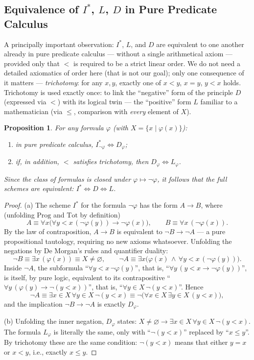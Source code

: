 \documentclass[12pt,a4paper]{article}
\theoremstyle{plain}
\newtheorem{proposition}[theorem]{Proposition}
\theoremstyle{definition}
\newcommand{\ph}{\varphi}
\newcommand{\toinf}{\rightarrow}
\begin{document}
\subsection{Equivalence of $I^*$, $L$, $D$ in Pure Predicate Calculus}
A principally important observation: $I^*$, $L$, and $D$ are equivalent to one another already in pure predicate calculus --- without a single arithmetical axiom --- provided only that $<$ is required to be a strict linear order. We do not need a detailed axiomatics of order here (that is not our goal); only one consequence of it matters --- \emph{trichotomy}: for any $x,y$, exactly one of $x<y$, $x=y$, $y<x$ holds. Trichotomy is used exactly once: to link the ``negative'' form of the principle $D$ (expressed via $<$) with its logical twin --- the ``positive'' form $L$ familiar to a mathematician (via $\leqslant$, comparison with \emph{every} element of $X$).

\begin{proposition}
For any formula $\ph$ (with $X=\{x \mid \ph(x)\}$):
\begin{enumerate}[label=(\alph*)]
    \item in pure predicate calculus, $I^*_{\neg\ph} \iff D_\ph$;
    \item if, in addition, $<$ satisfies trichotomy, then $D_\ph \iff L_\ph$.
\end{enumerate}
Since the class of formulas is closed under $\ph\mapsto\neg\ph$, it follows that the full schemes are equivalent: $I^*\iff D\iff L$.
\end{proposition}
\begin{proof}
(a) The scheme $I^*$ for the formula $\neg\ph$ has the form $A\toinf B$, where (unfolding $\mathrm{Prog}$ and $\mathrm{Tot}$ by definition)
$$A \equiv \forall x\big(\forall y{<}x\,(\neg\ph(y)) \toinf \neg\ph(x)\big), \qquad B\equiv \forall x\,(\neg\ph(x)).$$
By the law of contraposition, $A\toinf B$ is equivalent to $\neg B\toinf\neg A$ --- a pure propositional tautology, requiring no new axioms whatsoever. Unfolding the negations by De Morgan's rules and quantifier duality:
$$\neg B \equiv \exists x\,(\ph(x)) \equiv X\ne\varnothing, \qquad \neg A \equiv \exists x\big(\ph(x)\,\land\,\forall y{<}x\,(\neg\ph(y))\big).$$
Inside $\neg A$, the subformula ``$\forall y{<}x\,\neg\ph(y)$'', that is, ``$\forall y\,(y<x\toinf\neg\ph(y))$'', is itself, by pure logic, equivalent to its contrapositive ``$\forall y\,(\ph(y)\toinf\neg(y<x))$'', that is, ``$\forall y\in X\,\neg(y<x)$''. Hence
$$\neg A \equiv \exists x\in X\,\forall y\in X\,\neg(y<x) \equiv \neg\big(\forall x\in X\,\exists y\in X\,(y<x)\big),$$
and the implication $\neg B\toinf\neg A$ is exactly $D_\ph$.

(b) Unfolding the inner negation, $D_\ph$ states: $X\ne\varnothing\toinf\exists x\in X\,\forall y\in X\,\neg(y<x)$. The formula $L_\ph$ is literally the same, only with ``$\neg(y<x)$'' replaced by ``$x\leqslant y$''. By trichotomy these are the same condition: $\neg(y<x)$ means that either $y=x$ or $x<y$, i.e., exactly $x\leqslant y$.
\end{proof}
\end{document}
